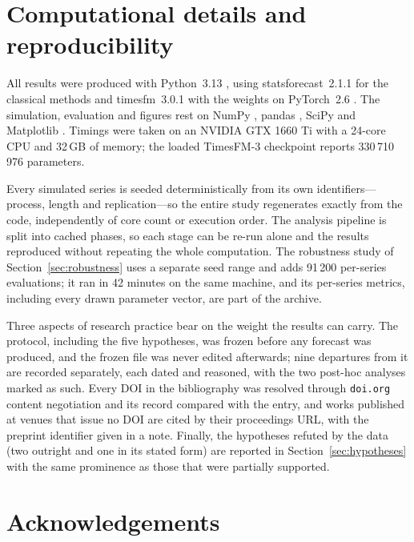 \documentclass[11pt]{article}
\newcommand{\pkg}[1]{\textsf{#1}}
\newcommand{\proglang}[1]{\textsf{#1}}
\newcommand{\code}[1]{\texttt{#1}}
\providecommand{\sectionref}[1]{Section~\ref{#1}}
\begin{document}
\section{Computational details and reproducibility}
\label{sec:repro}

All results were produced with \proglang{Python}~3.13 \citep{python}, using
\pkg{statsforecast}~2.1.1 \citep{statsforecast} for the classical methods and
\pkg{timesfm}~3.0.1 with the  weights \citep{timesfm3repo}
on \pkg{PyTorch}~2.6 \citep{paszke2019pytorch}. The simulation, evaluation and figures rest on
\pkg{NumPy} \citep{harris2020numpy}, \pkg{pandas} \citep{mckinney2010pandas}, \pkg{SciPy}
\citep{virtanen2020scipy} and \pkg{Matplotlib} \citep{hunter2007matplotlib}. Timings were taken
on an NVIDIA GTX 1660 Ti with a 24-core CPU and 32\,GB of memory; the loaded TimesFM-3
checkpoint reports 330\,710\,976 parameters.

Every simulated series is seeded deterministically from its own identifiers---process, length
and replication---so the entire study regenerates exactly from the code, independently of core
count or execution order. The analysis pipeline is split into cached phases, so each stage can
be re-run alone and the results reproduced without repeating the whole computation. The
robustness study of \sectionref{sec:robustness} uses a separate seed range and adds 91\,200
per-series evaluations; it ran in 42 minutes on the same machine, and its per-series metrics,
including every drawn parameter vector, are part of the archive.

Three aspects of research practice bear on the weight the results can carry. The protocol, including the five hypotheses, was frozen before any
forecast was produced, and the frozen file was never edited afterwards; nine departures from it
are recorded separately, each dated and reasoned, with the two post-hoc analyses marked as such.
Every DOI in the bibliography was resolved through \code{doi.org} content negotiation and its
record compared with the entry, and works published at venues that issue no DOI are cited by
their proceedings URL, with the preprint identifier given in a note. Finally, the hypotheses
refuted by the data (two outright and one in its stated form) are reported in \sectionref{sec:hypotheses} with the same prominence as those
that were partially supported.

\section*{Acknowledgements}
\end{document}
